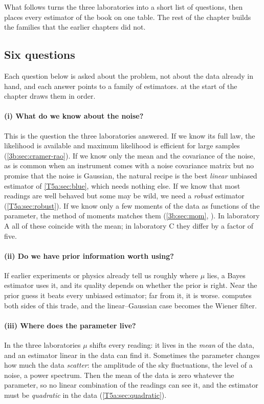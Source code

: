 What follows turns the three laboratories into a short list of questions,
then places every estimator of the book on one table. The rest of the
chapter builds the families that the earlier chapters did not.

\subsection{Six questions}
\label{T5a:sec:six-questions}

Each question below is asked about the problem, not about the data
already in hand, and each answer points to a family of estimators.
 at the start of the chapter draws them in order.

\paragraph{(i) What do we know about the noise?} This is the question the
three laboratories answered. If we know its full law, the likelihood is
available and maximum likelihood is efficient for large samples
(\cref{3b:sec:cramer-rao}). If we know only the mean and the covariance of
the noise, as is common when an instrument comes with a noise covariance
matrix but no promise that the noise is Gaussian, the natural recipe is the
best \emph{linear} unbiased estimator of \cref{T5a:sec:blue}, which needs
nothing else. If we know that most readings are well behaved but some may be
wild, we need a \emph{robust} estimator (\cref{T5a:sec:robust}). If we know
only a few moments of the data as functions of the parameter, the method of
moments matches them (\cref{3b:sec:mom}, ).
In laboratory A all of these coincide with the mean; in laboratory C they
differ by a factor of five.

\paragraph{(ii) Do we have prior information worth using?} If earlier
experiments or physics already tell us roughly where $\mu$ lies, a Bayes
estimator uses it, and its quality depends on whether the prior is right.
Near the prior guess it beats every unbiased estimator; far from it, it is
worse.  computes both sides of this trade, and the
linear--Gaussian case becomes the Wiener filter.

\paragraph{(iii) Where does the parameter live?} In the three laboratories
$\mu$ shifts every reading: it lives in the \emph{mean} of the data, and an
estimator linear in the data can find it. Sometimes the parameter changes
how much the data \emph{scatter}: the amplitude of the sky fluctuations, the
level of a noise, a power spectrum. Then the mean of the data is zero
whatever the parameter, so no linear combination of the readings can see it,
and the estimator must be \emph{quadratic} in the data
(\cref{T5a:sec:quadratic}).

